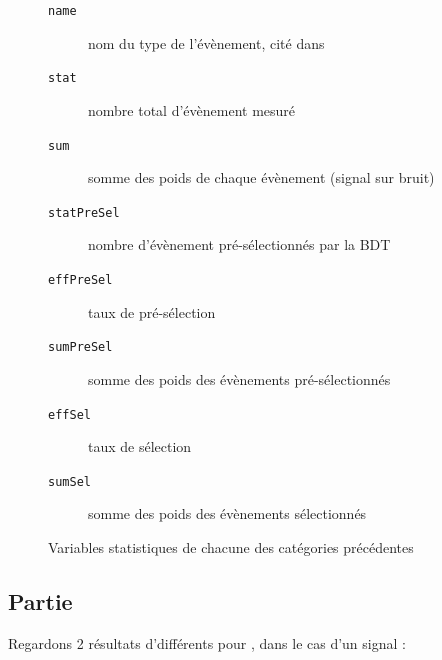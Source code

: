 \begin{figure}[!ht]
	\centering
	\begin{description}
		\item[\texttt{name}] nom du type de l'évènement, 
				cité dans \Figure{\ref{stats:results}}
		\item[\texttt{stat}] nombre total d'évènement mesuré
		\item[\texttt{sum}] somme des poids de chaque évènement (signal sur bruit)
		
		\item[\texttt{statPreSel}] nombre d'évènement pré-sélectionnés par la BDT
		\item[\texttt{effPreSel}] taux de pré-sélection
		\item[\texttt{sumPreSel}] somme des poids des évènements pré-sélectionnés 
		
		\item[\texttt{effSel}] taux de sélection
		\item[\texttt{sumSel}] somme des poids des évènements sélectionnés
	\end{description}
	\caption{Variables statistiques de chacune des catégories précédentes \Figure{\ref{stats:results}}}
	\label{stats:results:vrb}
\end{figure}

\subsection{Partie \original}

Regardons 2 résultats d'\analysis différents pour \bb, dans le cas d'un signal \Figure{\ref{stats:results:img}} :

